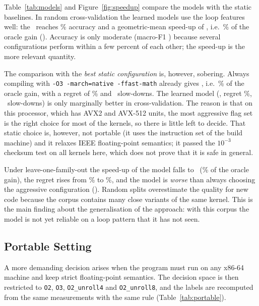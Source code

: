 

Table~\ref{tab:models} and Figure~\ref{fig:speedup} compare the models with the static baselines. In random
cross-validation the learned models use the loop features well: the \selModel\ reaches \selAccCV\% accuracy and a
geometric-mean speed-up of \selGMCV, i.e.\ \selFracCV\% of the oracle gain (\oracleGM). Accuracy is only moderate
(macro-F1 \selFscoreCV) because several configurations perform within a few percent of each other; the speed-up is the
more relevant quantity.

The comparison with the \emph{best static configuration} is, however, sobering. Always compiling with
\texttt{-O3 -march=native -ffast-math} already gives \gmOFast, i.e.\ \fastFrac\% of the oracle gain, with a regret of
\fastRegret\% and \fastSlow\ slow-downs. The learned model (\selGMCV, regret \selRegretCV\%, \selSlowCV\ slow-downs) is
only marginally better in cross-validation. The reason is that on this processor, which has AVX2 and AVX-512 units,
the most aggressive flag set is the right choice for most of the kernels, so there is little left to decide. That static
choice is, however, not portable (it uses the instruction set of the build machine) and it relaxes IEEE floating-point
semantics; it passed the $10^{-3}$ checksum test on all kernels here, which does not prove that it is safe in general.



Under leave-one-family-out the speed-up of the model falls to \selGMLOFO\ (\selFracLOFO\% of the oracle gain), the regret
rises from \selRegretCV\% to \selRegretLOFO\%, and the model is \emph{worse} than always choosing the aggressive
configuration (\gmOFast). Random splits overestimate the quality for new code because the corpus contains many close variants
of the same kernel. This is the main finding about the generalisation of the approach: with this corpus the model is not yet
reliable on a loop pattern that it has not seen.

\subsection{Portable Setting}

A more demanding decision arises when the program must run on any x86-64 machine and keep strict floating-point semantics.
The decision space is then restricted to \texttt{O2}, \texttt{O3}, \texttt{O2\_unroll4} and \texttt{O2\_unroll8}, and the
labels are recomputed from the same measurements with the same rule (Table~\ref{tab:portable}).

